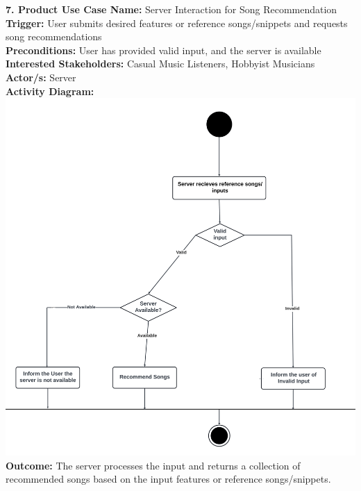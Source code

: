 \documentclass[12pt]{article}
\begin{document}
\textbf{7. Product Use Case Name:} Server Interaction for Song Recommendation \\
\textbf{Trigger:} User submits desired features or reference songs/snippets and requests song recommendations \\
\textbf{Preconditions:} User has provided valid input, and the server is available \\
\textbf{Interested Stakeholders:} Casual Music Listeners, Hobbyist Musicians \\
\textbf{Actor/s:} Server \\
\textbf{Activity Diagram:} \\
\includegraphics[width=\textwidth]{server_song_rec.png} \\
\textbf{Outcome:} The server processes the input and returns a collection of recommended songs based on the input features or reference songs/snippets.

\vspace{1cm}
\end{document}
